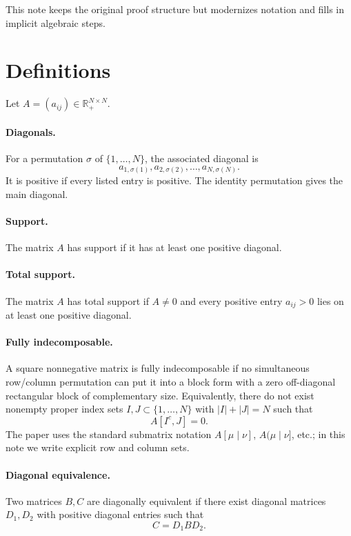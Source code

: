 This note keeps the original proof structure but modernizes notation and fills in implicit algebraic steps.

\section{Definitions}
Let \(A=(a_{ij})\in\mathbb{R}_+^{N\times N}\).

\paragraph{Diagonals.}
For a permutation \(\sigma\) of \(\{1,
\ldots,N\}\), the associated diagonal is
\[
  a_{1,\sigma(1)},a_{2,\sigma(2)},\ldots,a_{N,\sigma(N)}.
\]
It is positive if every listed entry is positive.  The identity permutation gives the main diagonal.

\paragraph{Support.}
The matrix \(A\) has support if it has at least one positive diagonal.

\paragraph{Total support.}
The matrix \(A\) has total support if \(A\ne0\) and every positive entry \(a_{ij}>0\) lies on at least one positive diagonal.

\paragraph{Fully indecomposable.}
A square nonnegative matrix is fully indecomposable if no simultaneous row/column permutation can put it into a block form with a zero off-diagonal rectangular block of complementary size.  Equivalently, there do not exist nonempty proper index sets \(I,J\subset\{1,
\ldots,N\}\) with \(|I|+|J|=N\) such that
\[
  A[I^c,J]=0.
\]
The paper uses the standard submatrix notation \(A[\mu\mid \nu]\), \(A(\mu\mid\nu]\), etc.; in this note we write explicit row and column sets.

\paragraph{Diagonal equivalence.}
Two matrices \(B,C\) are diagonally equivalent if there exist diagonal matrices \(D_1,D_2\) with positive diagonal entries such that
\[
  C=D_1BD_2.
\]

